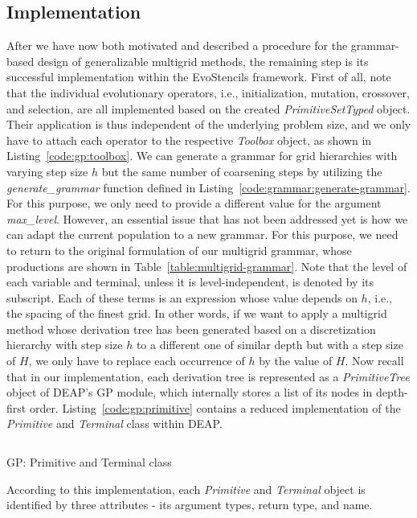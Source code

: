 \subsection{Implementation}
After we have now both motivated and described a procedure for the grammar-based design of generalizable multigrid methods, the remaining step is its successful implementation within the EvoStencils framework.
First of all, note that the individual evolutionary operators, i.e., initialization, mutation, crossover, and selection, are all implemented based on the created \emph{PrimitiveSetTyped} object. 
Their application is thus independent of the underlying problem size, and we only have to attach each operator to the respective \emph{Toolbox} object, as shown in Listing~\ref{code:gp:toolbox}.
We can generate a grammar for grid hierarchies with varying step size $h$ but the same number of coarsening steps by utilizing the \emph{generate\_grammar} function defined in Listing~\ref{code:grammar:generate-grammar}.
For this purpose, we only need to provide a different value for the argument \emph{max\_level}.
However, an essential issue that has not been addressed yet is how we can adapt the current population to a new grammar.
For this purpose, we need to return to the original formulation of our multigrid grammar, whose productions are shown in Table~\ref{table:multigrid-grammar}.
Note that the level of each variable and terminal, unless it is level-independent, is denoted by its subscript.
Each of these terms is an expression whose value depends on $h$, i.e., the spacing of the finest grid.
In other words, if we want to apply a multigrid method whose derivation tree has been generated based on a discretization hierarchy with step size $h$ to a different one of similar depth but with a step size of $H$, we only have to replace each occurrence of $h$ by the value of $H$.
Now recall that in our implementation, each derivation tree is represented as a \emph{PrimitiveTree} object of DEAP's GP module, which internally stores a list of its nodes in depth-first order.
Listing~\ref{code:gp:primitive} contains a reduced implementation of the \emph{Primitive} and \emph{Terminal} class within DEAP.
\begin{listing}
	\inputminted{python}{evostencils/gp/primitive.py}
	\caption{GP: Primitive and Terminal class}
	\label{code:gp:primitive}
\end{listing}
According to this implementation, each \emph{Primitive} and \emph{Terminal} object is identified by three attributes - its argument types, return type, and name.
